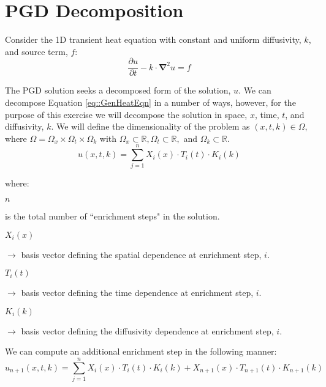\documentclass{article}
\def\ds{\displaystyle}
\def\pd{\partial}
\def\grad{\mathbf\nabla}
\begin{document}
\section{PGD Decomposition}
Consider the 1D transient heat equation with constant and uniform diffusivity, $k$, and source term, $f$:
\begin{equation}
\label{eq::GenHeatEqn}
\frac{\pd u}{\pd t} -k\cdot \grad^2 u = f
\end{equation}

The PGD solution seeks a decomposed form of the solution, $u$. We can decompose Equation \ref{eq::GenHeatEqn} in a number of ways, however, for the purpose of this exercise we will decompose the solution in space, $x$, time, $t$, and diffusivity, $k$. We will define the dimensionality of the problem as $\left( x,t,k \right) \in \Omega$, where $\Omega = \Omega_x \times \Omega_t \times \Omega_k$ with $\Omega_x \subset \mathbb{R}, \Omega_t \subset \mathbb{R},$ and $\Omega_k \subset \mathbb{R}$.
\begin{equation}
u(x,t,k) = \ds\sum_{j=1}^n X_i(x) \cdot T_i(t) \cdot K_i(k)
\end{equation}

\vspace{-6pt}where:\\[-3pt]

\hspace*{15pt}\begin{minipage}{4.5in}

$n$
\parbox[t][0.65cm]{4.5in}{ is the total number of ``enrichment steps" in the solution.}

$X_i(x)$
\parbox[t][0.65cm]{4.5in}{ $\to$ basis vector defining the spatial dependence at enrichment step, $i$.}

$T_i(t)$
\parbox[t][0.65cm]{4.5in}{ $\to$ basis vector defining the time dependence at enrichment step, $i$.}

$K_i(k)$
\parbox[t][0.65cm]{4.5in}{ $\to$ basis vector defining the diffusivity dependence at enrichment step, $i$.}

\end{minipage}\vspace{5pt}

We can compute an additional enrichment step in the following manner:
\begin{equation}
\label{eq::TrialFctn}
u_{n+1}(x,t,k) = \ds\sum_{j=1}^n X_i(x) \cdot T_i(t) \cdot K_i(k) + X_{n+1}(x) \cdot T_{n+1}(t) \cdot K_{n+1}(k)
\end{equation}
\end{document}
